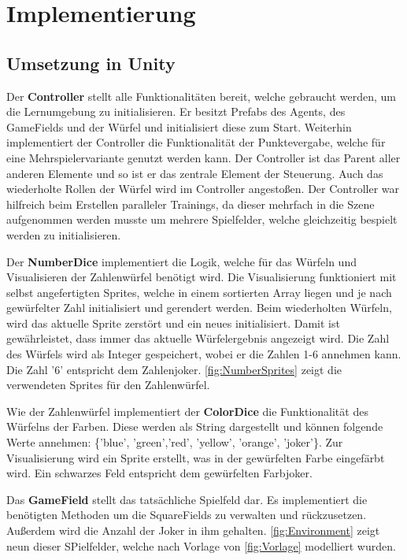 

\clearpage
\chapter{Implementierung}
\section{Umsetzung in Unity}
Der \textbf{Controller} stellt alle Funktionalitäten bereit, welche gebraucht werden, um die Lernumgebung zu initialisieren.
Er besitzt Prefabs des Agents, des GameFields und der Würfel und initialisiert diese zum Start.
Weiterhin implementiert der Controller die Funktionalität der Punktevergabe, welche für eine Mehrspielervariante genutzt werden kann.
Der Controller ist das Parent aller anderen Elemente und so ist er das zentrale Element der Steuerung. Auch das wiederholte Rollen der Würfel wird im Controller angestoßen.
Der Controller war hilfreich beim Erstellen paralleler Trainings, da dieser mehrfach in die Szene aufgenommen werden musste um mehrere Spielfelder, welche gleichzeitig bespielt werden zu initialisieren.

Der \textbf{NumberDice} implementiert die Logik, welche für das Würfeln und Visualisieren der Zahlenwürfel benötigt wird.
Die Visualisierung funktioniert mit selbst angefertigten Sprites, welche in einem sortierten Array liegen und je nach gewürfelter Zahl initialisiert und gerendert werden.
Beim wiederholten Würfeln, wird das aktuelle Sprite zerstört und ein neues initialisiert.
Damit ist gewährleistet, dass immer das aktuelle Würfelergebnis angezeigt wird.
Die Zahl des Würfels wird als Integer gespeichert, wobei er die Zahlen 1-6 annehmen kann.
Die Zahl '6' entspricht dem Zahlenjoker. \ref{fig:NumberSprites} zeigt die verwendeten Sprites für den Zahlenwürfel. 


Wie der Zahlenwürfel implementiert der \textbf{ColorDice} die Funktionalität des Würfelns der Farben.
Diese werden als String dargestellt und können folgende Werte annehmen: \{'blue', 'green','red', 'yellow', 'orange', 'joker'\}.
Zur Visualisierung wird ein Sprite erstellt, was in der gewürfelten Farbe eingefärbt wird. Ein schwarzes Feld entspricht dem gewürfelten Farbjoker.


Das \textbf{GameField} stellt das tatsächliche Spielfeld dar.
Es implementiert die benötigten Methoden um die SquareFields zu verwalten und rückzusetzen.
Außerdem wird die Anzahl der Joker in ihm gehalten. \ref{fig:Environment} zeigt neun dieser SPielfelder, welche nach Vorlage von \ref{fig:Vorlage} modelliert wurden.

